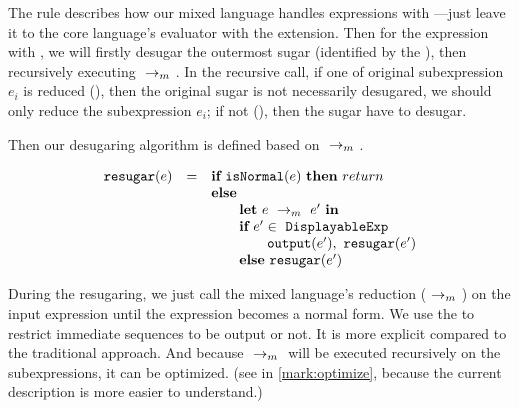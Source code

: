 {}

{
}

The  rule describes how our mixed language handles expressions with ---just leave it to the core language's evaluator with the extension. Then for the expression with , we will firstly desugar the outermost sugar (identified by the ), then recursively executing $~\rightarrow_m~$. In the recursive call, if one of original subexpression $e_i$ is reduced (), then the original sugar is not necessarily desugared, we should only reduce the subexpression $e_i$; if not (), then the sugar have to desugar.


Then our desugaring algorithm is defined based on $~\rightarrow_m~$.

\[
\begin{array}{llll}
\mbox{\tt resugar} (e) &=& \mbox{\rm \bf if}~\mbox{\tt isNormal}(e)~\mbox{\rm \bf then}~return\\
              & & \mbox{\rm \bf else}~\\
							& & \qquad \mbox{\rm \bf let}~e ~\rightarrow_m~e'~\mbox{\rm \bf in}\\
							& & \qquad \mbox{\rm \bf if}~e' \in~\mbox{\tt DisplayableExp} \\
							& & \qquad \qquad \mbox{\tt output}(e'),~\mbox{\tt resugar}(e')\\
							& & \qquad \mbox{\rm \bf else}~\mbox{\tt resugar}(e')
\end{array}
\]

During the resugaring, we just call the mixed language's reduction ($~\rightarrow_m~$) on the input expression until the expression becomes a normal form. We use the  to restrict immediate sequences to be output or not. It is more explicit compared to the traditional approach. And because $~\rightarrow_m~$ will be executed recursively on the subexpressions, it can be optimized. (see in \ref{mark:optimize}, because the current description is more easier to understand.)


